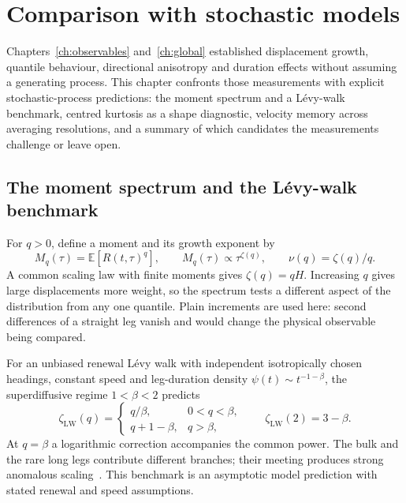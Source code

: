 \chapter{Comparison with stochastic models}
\label{ch:models}

Chapters~\ref{ch:observables} and~\ref{ch:global} established displacement growth,
quantile behaviour, directional anisotropy and duration effects without assuming a
generating process.
This chapter confronts those measurements with explicit stochastic-process
predictions: the moment spectrum and a L\'evy-walk benchmark, centred kurtosis as
a shape diagnostic, velocity memory across averaging resolutions, and a summary
of which candidates the measurements challenge or leave open.

\section{The moment spectrum and the L\'evy-walk benchmark}
\label{sec:transport-shape}

For $q>0$, define a moment and its growth exponent by
\begin{equation}
  M_q(\tau)=\mathbb E[R(t,\tau)^q],\qquad
  M_q(\tau)\propto\tau^{\zeta(q)},\qquad \nu(q)=\zeta(q)/q.
  \label{eq:moment-spectrum}
\end{equation}
A common scaling law with finite moments gives $\zeta(q)=qH$. Increasing $q$ gives large
displacements more weight, so the spectrum tests a different aspect of the distribution
from any one quantile. Plain increments are used here: second differences of a straight
leg vanish and would change the physical observable being compared.

For an unbiased renewal L\'evy walk with independent isotropically chosen headings,
constant speed and leg-duration density
$\psi(t)\sim t^{-1-\beta}$, the superdiffusive regime $1<\beta<2$ predicts
\begin{equation}
  \zeta_{\mathrm{LW}}(q)=
  \begin{cases}
    q/\beta,&0<q<\beta,\\
    q+1-\beta,&q>\beta,
  \end{cases}
  \qquad \zeta_{\mathrm{LW}}(2)=3-\beta.
  \label{eq:levy-spectrum}
\end{equation}
At $q=\beta$ a logarithmic correction accompanies the common power. The bulk and the
rare long legs contribute different branches; their meeting produces strong anomalous
scaling~\cite{zaburdaev2015,rebenshtok2014}. This benchmark is an asymptotic model
prediction with stated renewal and speed assumptions.

